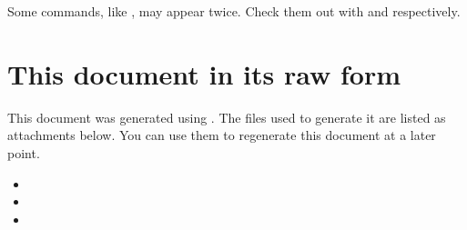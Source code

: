 \documentclass{olli-handout}
\begin{document}
{\olliHandLeft} Some commands, like , may appear twice. Check them out with  and  respectively.

\section{This document in its raw form}

This document was generated using {\fi}. The files used to generate it are listed as attachments below. You can use them to regenerate this document at a later point.

\begin{itemize}
    \item {}
    \item {}
    \item {}
\end{itemize}

\tableofcontents{}
\end{document}
